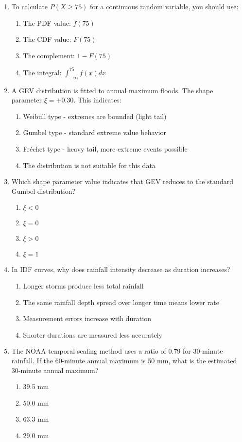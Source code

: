 \documentclass[11pt,a4paper]{article}
\begin{document}
\begin{enumerate}
\item To calculate $P(X \geq 75)$ for a continuous random variable, you should use:
\begin{enumerate}[label=\Alph*)]
    \item The PDF value: $f(75)$
    \item The CDF value: $F(75)$
    \item The complement: $1 - F(75)$
    \item The integral: $\int_{-\infty}^{75} f(x)dx$
\end{enumerate}

\item A GEV distribution is fitted to annual maximum floods. The shape parameter $\xi = +0.30$. This indicates:
\begin{enumerate}[label=\Alph*)]
    \item Weibull type - extremes are bounded (light tail)
    \item Gumbel type - standard extreme value behavior
    \item Fréchet type - heavy tail, more extreme events possible
    \item The distribution is not suitable for this data
\end{enumerate}

\item Which shape parameter value indicates that GEV reduces to the standard Gumbel distribution?
\begin{enumerate}[label=\Alph*)]
    \item $\xi < 0$
    \item $\xi = 0$
    \item $\xi > 0$
    \item $\xi = 1$
\end{enumerate}

\item In IDF curves, why does rainfall intensity decrease as duration increases?
\begin{enumerate}[label=\Alph*)]
    \item Longer storms produce less total rainfall
    \item The same rainfall depth spread over longer time means lower rate
    \item Measurement errors increase with duration
    \item Shorter durations are measured less accurately
\end{enumerate}

\item The NOAA temporal scaling method uses a ratio of 0.79 for 30-minute rainfall. If the 60-minute annual maximum is 50 mm, what is the estimated 30-minute annual maximum?
\begin{enumerate}[label=\Alph*)]
    \item 39.5 mm
    \item 50.0 mm
    \item 63.3 mm
    \item 29.0 mm
\end{enumerate}


\end{enumerate}
\end{document}
